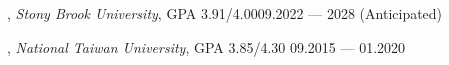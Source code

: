 


, \textit{Stony Brook University}, GPA 3.91/4.00\hfill 09.2022 --- 2028 (Anticipated)

, \textit{National Taiwan University}, GPA 3.85/4.30 \hfill	09.2015 --- 01.2020
